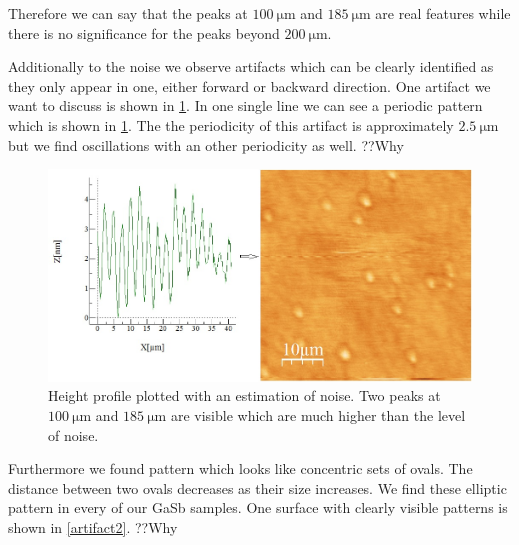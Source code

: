 \documentclass[paper=a4,fontsize=10pt,DIV=18,twocolumn,parskip=half]{scrartcl}
\numberwithin{equation}{section}    %
\begin{document}
Therefore we can say that the peaks at $\SI{100}{\micro\meter}$ and 
$\SI{185}{\micro\meter}$ are real features while there is no significance for 
the peaks beyond $\SI{200}{\micro\meter}$.

Additionally to the noise we observe artifacts which can be clearly identified 
as they only appear in one, either forward or backward direction. One artifact 
we want to discuss is shown in \cref{artifact1}. In one single line we can see a 
periodic pattern which is shown in \ref{artifact1}. The the periodicity of this 
artifact is approximately $\SI{2.5}{\micro\meter}$ but we find oscillations with 
an other periodicity as well. ??Why\\
\begin{figure}
    \begin{center}
        \includegraphics[width=\columnwidth]{Bilder/artifact1}
        \caption{Height profile plotted with an estimation of noise. Two peaks 
        at $\SI{100}{\micro\meter}$ and $\SI{185}{\micro\meter}$ are visible 
        which are much higher than the level of noise. }
        \label{artifact1}
    \end{center}
\end{figure}

Furthermore we found pattern which looks like concentric sets of ovals. The 
distance between two ovals decreases as their size increases. We find these 
elliptic pattern in every of our GaSb samples. One surface with clearly visible 
patterns is shown in \ref{artifact2}. ??Why
\end{document}
